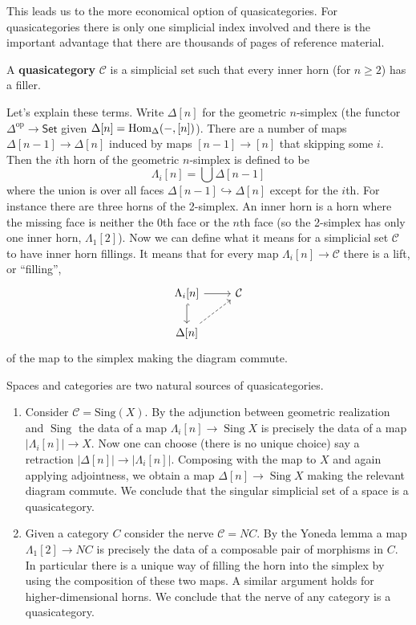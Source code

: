 \documentclass{amsart}
\DeclareMathOperator{\Sing}{Sing}
\begin{document}
This leads us to the more economical option of quasicategories. For quasicategories
there is only one simplicial index involved and there is the important advantage
that there are thousands of pages of reference material.
\begin{definition}
    A \textbf{quasicategory} $\mathcal{C}$ is a simplicial set such that every
    inner horn (for $n\geq 2$) has a filler.
\end{definition}
Let's explain these terms. Write $\Delta[n]$ for the geometric $n$-simplex (the
functor $\Delta^\text{op}\to \mathsf{Set}$ given $\Delta[n]=\operatorname{Hom}_\Delta(-,[n])$).
There are a number of maps $\Delta[n-1]\to \Delta[n]$ induced by maps
$[n-1]\to[n]$ that skipping some $i$.
Then the $i$th horn of the geometric $n$-simplex is defined to be
\begin{equation*}
    \Lambda_i[n]=\bigcup\Delta[n-1]
\end{equation*}
where the union is over all faces $\Delta[n-1]\hookrightarrow\Delta[n]$ except for the
$i$th. For instance there are three horns of the 2-simplex.
An inner horn is a horn where the missing face is neither the $0$th face or the
$n$th face (so the 2-simplex has only one inner horn, $\Lambda_1[2]$).
Now we can define what it means for a simplicial set $\mathcal{C}$ to have
inner horn fillings. It means that for every map $\Lambda_i[n]\to\mathcal{C}$
there is a lift, or ``filling'',
\begin{equation*}
    \begin{tikzcd}
        \Lambda_i[n] \ar[r]\ar[d,hook] & \mathcal{C} \\
        \Delta[n]\ar[ur, dashed]
    \end{tikzcd}
\end{equation*}
of the map to the simplex making the diagram commute.

\begin{example}
    Spaces and categories are two natural sources of quasicategories.
    \begin{enumerate}
        \item Consider $\mathcal{C}=\text{Sing}(X)$. By the adjunction between geometric
            realization and $\Sing$ the data of a map $\Lambda_i[n]\to \Sing X$ is precisely
            the data of a map $|\Lambda_i[n]|\to X$. Now one can choose (there is no unique
            choice) say a retraction $|\Delta[n]|\to |\Lambda_i[n]|$. Composing with the map
            to $X$ and again applying adjointness, we obtain a map $\Delta[n]\to \Sing X$
            making the relevant diagram commute. We conclude that the singular simplicial
            set of a space is a quasicategory.
        \item Given a category $C$ consider the nerve $\mathcal{C}=NC$. By the Yoneda lemma
            a map $\Lambda_1[2]\to NC$ is precisely the data of a composable pair of
            morphisms in $C$. In particular there is a unique way of filling the
            horn into the simplex by using the composition of these two maps. A similar
            argument holds for higher-dimensional horns. We conclude that the nerve of any
            category is a quasicategory.
    \end{enumerate}
\end{example}
\end{document}
